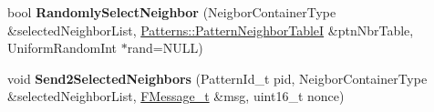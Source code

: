 \begin{DoxyCompactItemize}
\item 
bool {\bfseries Randomly\+Select\+Neighbor} (Neigbor\+Container\+Type \&selected\+Neighbor\+List, \hyperlink{class_patterns_1_1_pattern_neighbor_table_i}{Patterns\+::\+Pattern\+Neighbor\+TableI} \&ptn\+Nbr\+Table, Uniform\+Random\+Int $\ast$rand=N\+U\+LL)\hypertarget{class_patterns_1_1_pattern_base_af63159c86bda47a2492815735826dbab}{}\label{class_patterns_1_1_pattern_base_af63159c86bda47a2492815735826dbab}

\item 
void {\bfseries Send2\+Selected\+Neighbors} (Pattern\+Id\+\_\+t pid, Neigbor\+Container\+Type \&selected\+Neighbor\+List, \hyperlink{class_core_1_1_message_t}{F\+Message\+\_\+t} \&msg, uint16\+\_\+t nonce)\hypertarget{class_patterns_1_1_pattern_base_ac52dc18caa96893bd35d6c68970a5bec}{}\label{class_patterns_1_1_pattern_base_ac52dc18caa96893bd35d6c68970a5bec}

\end{DoxyCompactItemize}
